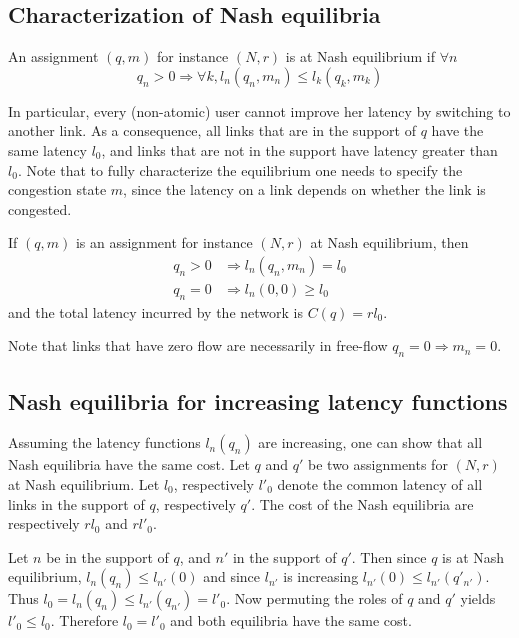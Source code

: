 \subsection{Characterization of Nash equilibria}

\begin{definition}
An assignment $(q, m)$ for instance $(N, r)$ is at Nash equilibrium if $\forall n$
\[
q_n > 0 \Rightarrow \forall k, l_n(q_n, m_n) \leq l_k(q_k, m_k)
\]
\end{definition}

In particular, every (non-atomic) user cannot improve her latency by switching to another link. As a consequence, all links that are in the support of $q$ have the same latency $l_0$, and links that are not in the support have latency greater than $l_0$. Note that to fully characterize the equilibrium one needs to specify the congestion state $m$, since the latency on a link depends on whether the link is congested.

\begin{lemma}
\label{lemma:nash_eq}
If $(q, m)$ is an assignment for instance $(N, r)$ at Nash equilibrium, then
\begin{align*}
q_n >0 &\Rightarrow l_n(q_n, m_n) = l_0\\
q_n = 0 &\Rightarrow l_n(0, 0) \geq l_0
\end{align*}
and the total latency incurred by the network is $C(q) = r l_0$.
\end{lemma}

Note that links that have zero flow are necessarily in free-flow $q_n = 0 \Rightarrow m_n = 0$.

\subsection{Nash equilibria for increasing latency functions}
Assuming the latency functions $l_n(q_n)$ are increasing, one can show that all Nash equilibria have the same cost. Let $q$ and $q'$ be two assignments for $(N, r)$ at Nash equilibrium. Let $l_0$, respectively $l'_0$ denote the common latency of all links in the support of $q$, respectively $q'$. The cost of the Nash equilibria are respectively $rl_0$ and $rl'_0$.

Let $n$ be in the support of $q$, and $n'$ in the support of $q'$. Then since $q$ is at Nash equilibrium, $l_n(q_n) \leq l_{n'}(0)$ and since $l_{n'}$ is increasing $l_{n'}(0) \leq l_{n'}(q'_{n'})$. Thus $l_0 = l_n(q_n) \leq l_{n'}(q_{n'}) = l'_0$. Now permuting the roles of $q$ and $q'$ yields $l'_0 \leq l_0$. Therefore $l_0 = l'_0$ and both equilibria have the same cost.

